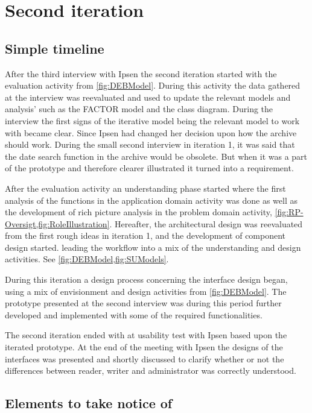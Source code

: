 \section{Second iteration}
\subsection{Simple timeline}\label{sec:2Iteration-timeline}
After the third interview with Ipsen the second iteration started with the evaluation activity from \cref{fig:DEBModel}. 
During this activity the data gathered at the interview was reevaluated and used to update the relevant models and analysis' such as the FACTOR model and the class diagram.
During the interview the first signs of the iterative model being the relevant model to work with became clear.
Since Ipsen had changed her decision upon how the archive should work.
 During the small second interview in iteration 1, it was said that the date search function in the archive would be obsolete.
But when it was a part of the prototype and therefore clearer illustrated it turned into a requirement.

After the evaluation activity an understanding phase started where the first analysis of the functions in the application domain activity was done as well as the development of rich picture analysis in the problem domain activity, \cref{fig:RP-Oversigt,fig:RoleIllustration}.
Hereafter, the architectural design was reevaluated from the first rough ideas in iteration 1, and the development of component design started.
leading the workflow into a mix of the understanding and design activities. 
See \cref{fig:DEBModel,fig:SUModels}.

During this iteration a design process concerning the interface design began, using a mix of envisionment and design activities from \cref{fig:DEBModel}.
The prototype presented at the second interview was during this period further developed and implemented with some of the required functionalities.

The second iteration ended with at usability test with Ipsen based upon the iterated prototype. 
At the end of the meeting with Ipsen the designs of the interfaces was presented and shortly discussed to clarify whether or not the differences between reader, writer and administrator was correctly understood.

\subsection{Elements to take notice of}

